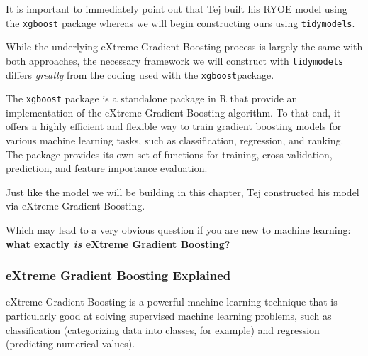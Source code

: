 \documentclass[
  letterpaper,
]{krantz}
\begin{document}
\begin{tcolorbox}[enhanced jigsaw, left=2mm, toprule=.15mm, opacitybacktitle=0.6, leftrule=.75mm, bottomrule=.15mm, colbacktitle=quarto-callout-important-color!10!white, breakable, colback=white, bottomtitle=1mm, toptitle=1mm, title=\textcolor{quarto-callout-important-color}{\faExclamation}\hspace{0.5em}{Important}, coltitle=black, titlerule=0mm, arc=.35mm, opacityback=0, colframe=quarto-callout-important-color-frame, rightrule=.15mm]

It is important to immediately point out that Tej built his RYOE model
using the \texttt{xgboost} package whereas we will begin constructing
ours using \texttt{tidymodels}.

While the underlying eXtreme Gradient Boosting process is largely the
same with both approaches, the necessary framework we will construct
with \texttt{tidymodels} differs \emph{greatly} from the coding used
with the \texttt{xgboost}package.

The \texttt{xgboost} package is a standalone package in R that provide
an implementation of the eXtreme Gradient Boosting algorithm. To that
end, it offers a highly efficient and flexible way to train gradient
boosting models for various machine learning tasks, such as
classification, regression, and ranking. The package provides its own
set of functions for training, cross-validation, prediction, and feature
importance evaluation.

\end{tcolorbox}

Just like the model we will be building in this chapter, Tej constructed
his model via eXtreme Gradient Boosting.

Which may lead to a very obvious question if you are new to machine
learning: \textbf{what exactly \emph{is} eXtreme Gradient Boosting?}

\hypertarget{extreme-gradient-boosting-explained}{%
\subsubsection{eXtreme Gradient Boosting
Explained}\label{extreme-gradient-boosting-explained}}

eXtreme Gradient Boosting is a powerful machine learning technique that
is particularly good at solving supervised machine learning problems,
such as classification (categorizing data into classes, for example) and
regression (predicting numerical values).
\end{document}
